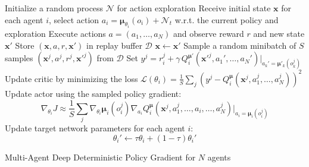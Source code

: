 \documentclass{article}
\newcommand{\cpol}[0]{\pmb{\mu}}
\begin{document}
\begin{algorithm}[H]
 \SetAlgoLined
  \begin{algorithmic}
      \STATE Initialize a random process $\mathcal{N}$ for action exploration
      \STATE Receive initial state $\mathbf{x}$
          \STATE for each agent $i$, select action $a_i=\cpol_{\theta_i}(o_i)+\mathcal{N}_t$ w.r.t. the current policy and exploration
          \STATE Execute actions $a=(a_1,\ldots,a_N)$ and observe reward $r$ and new state $\mathbf{x}'$
          \STATE Store $(\mathbf{x},a,r,\mathbf{x}')$ in replay buffer $\mathcal{D}$
          \STATE $\mathbf{x}\gets\mathbf{x}'$
            \STATE Sample a random minibatch of $S$ samples $(\mathbf{x}^j,a^j,r^j,\mathbf{x}'^j)$ from $\mathcal{D}$
            \STATE Set $y^j=r_i^j+\gamma\, Q_i^{\cpol'}(\mathbf{x}'^j,a_1',\ldots,a_N')|_{a_k'=\cpol'_k(o_k^j)}$
            \STATE Update critic by minimizing the loss $\mathcal{L}(\theta_i)=\frac{1}{S}\sum_j\left(y^j-Q_i^{\cpol}(\mathbf{x}^j,a^j_1,\ldots,a^j_N)\right)^2$
            \STATE Update actor using the sampled policy gradient:
            $$
            \nabla_{\theta_i}J\approx\frac{1}{S}\sum_j\nabla_{\theta_i}\cpol_i(o_i^j)\nabla_{a_i}Q_i^{\cpol}(\mathbf{x}^j,a^j_1,\ldots,a_i,\ldots,a^j_N)\big|_{a_i=\cpol_i(o_i^j)}
            $$
          \ENDFOR     
          \STATE Update target network parameters for each agent $i$:
          $$
          \theta_i'\gets\tau\theta_i+(1-\tau)\theta_i'
          $$
      \ENDFOR
    \ENDFOR
  \end{algorithmic}
 \caption{Multi-Agent Deep Deterministic Policy Gradient for $N$ agents}
\end{algorithm}
\end{document}

